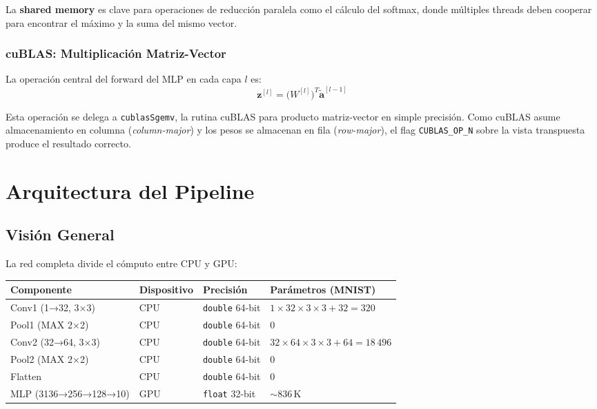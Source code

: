 \documentclass[12pt,a4paper]{article}
\begin{document}
La \textbf{shared memory} es clave para operaciones de reducción paralela como el
cálculo del softmax, donde múltiples threads deben cooperar para encontrar el máximo
y la suma del mismo vector.

\subsubsection{cuBLAS: Multiplicación Matriz-Vector}

La operación central del forward del MLP en cada capa $l$ es:
\begin{equation}
  \mathbf{z}^{[l]} = \bigl(W^{[l]}\bigr)^T \tilde{\mathbf{a}}^{[l-1]}
  \label{eq:matvec}
\end{equation}

Esta operación se delega a \texttt{cublasSgemv}, la rutina cuBLAS para producto
matriz-vector en simple precisión. Como cuBLAS asume almacenamiento en columna
(\textit{column-major}) y los pesos se almacenan en fila (\textit{row-major}), el
flag \texttt{CUBLAS\_OP\_N} sobre la vista transpuesta produce el resultado correcto.

\section{Arquitectura del Pipeline}

\subsection{Visión General}

La red completa divide el cómputo entre CPU y GPU:

\begin{center}
\begin{tabular}{llll}
\toprule
\textbf{Componente}   & \textbf{Dispositivo} & \textbf{Precisión}      & \textbf{Parámetros (MNIST)} \\
\midrule
Conv1 (1→32, 3×3)     & CPU                  & \texttt{double} 64-bit  & $1\times32\times3\times3 + 32 = 320$ \\
Pool1 (MAX 2×2)       & CPU                  & \texttt{double} 64-bit  & 0 \\
Conv2 (32→64, 3×3)    & CPU                  & \texttt{double} 64-bit  & $32\times64\times3\times3 + 64 = 18\,496$ \\
Pool2 (MAX 2×2)       & CPU                  & \texttt{double} 64-bit  & 0 \\
Flatten               & CPU                  & \texttt{double} 64-bit  & 0 \\
MLP (3136→256→128→10) & GPU                  & \texttt{float}  32-bit  & $\sim$836\,K \\
\bottomrule
\end{tabular}
\end{center}
\end{document}
